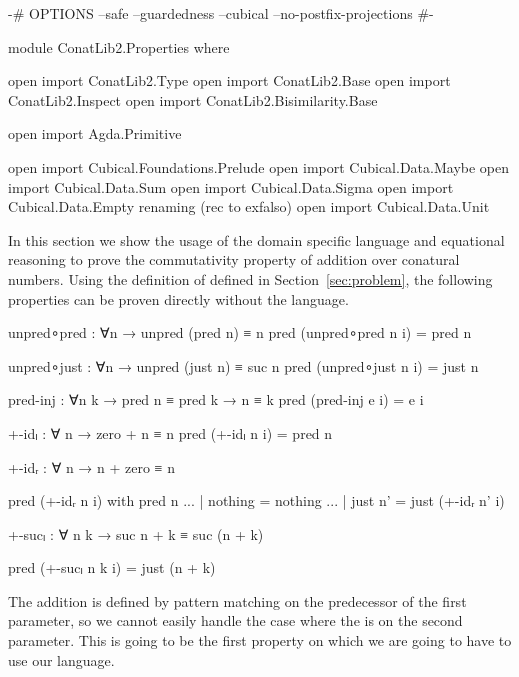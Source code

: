 \begin{code}[hide]
{-# OPTIONS --safe --guardedness --cubical --no-postfix-projections #-}

module ConatLib2.Properties where

open import ConatLib2.Type
open import ConatLib2.Base
open import ConatLib2.Inspect
open import ConatLib2.Bisimilarity.Base

open import Agda.Primitive

open import Cubical.Foundations.Prelude
open import Cubical.Data.Maybe
open import Cubical.Data.Sum
open import Cubical.Data.Sigma
open import Cubical.Data.Empty
  renaming (rec to exfalso)
open import Cubical.Data.Unit
\end{code}

In this section we show the usage of the domain specific language and
equational reasoning to prove the commutativity property of addition
over conatural numbers. Using the definition of \AgdaFunction{\_+\_}
defined in Section~\ref{sec:problem}, the following properties can be proven
directly without the language.

\begin{code}[hide]
unpred∘pred : ∀{n} → unpred (pred n) ≡ n
pred (unpred∘pred {n} i) = pred n

unpred∘just : ∀{n} → unpred (just n) ≡ suc n
pred (unpred∘just {n} i) = just n

pred-inj : ∀{n k} → pred n ≡ pred k → n ≡ k
pred (pred-inj e i) = e i
\end{code}
\begin{code}[hide]
+-idₗ : ∀ n → zero + n ≡ n
pred (+-idₗ n i) = pred n
\end{code}
\begin{code}
+-idᵣ : ∀ n → n + zero ≡ n
\end{code}
\begin{code}[hide]
pred (+-idᵣ n i) with pred n
... | nothing = nothing
... | just n' = just (+-idᵣ n' i)
\end{code}
\begin{code}
+-sucₗ : ∀ n k → suc n + k ≡ suc (n + k)
\end{code}
\begin{code}[hide]
pred (+-sucₗ n k i) = just (n + k)
\end{code}

The addition is defined by pattern matching on the predecessor of the
first parameter, so we cannot easily handle the case where the 
is on the second parameter. This is going to be the first property on which
we are going to have to use our language.

